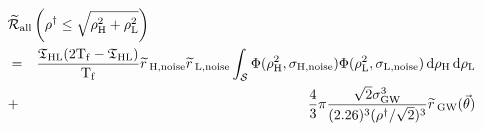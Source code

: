 \begin{eqnarray}
\label{eqn:exampleSources}
\lefteqn{ \tR_{\mathrm{all}} \left(\rho^\dagger \leq \sqrt{\rho_\varH^2 + \rho_\varL^2} \right) } \nonumber \\
& = & \frac{\coincT_{\varH\varL}(2\Tf - \coincT_{\varH\varL})}{\Tf} \rsrc_{\varH,\mathrm{noise}}\rsrc_{\varL,\mathrm{noise}} \int_{\mathcal{S}} \Phi(\rho_{\varH}^2, \sigma_{\varH,\mathrm{noise}})\Phi(\rho_{\varL}^2,\sigma_{\varL,\mathrm{noise}}) \d \rho_{\varH} \d \rho_{\varL} \nonumber \\
 & + & \frac{4}{3} \pi \frac{\sqrt{2} \sigma_{\mathrm{GW}}^3}{(2.26)^3 (\rho^\dagger / \sqrt{2})^3} \rsrc_{\mathrm{GW}}(\vec{\theta})
\end{eqnarray}


